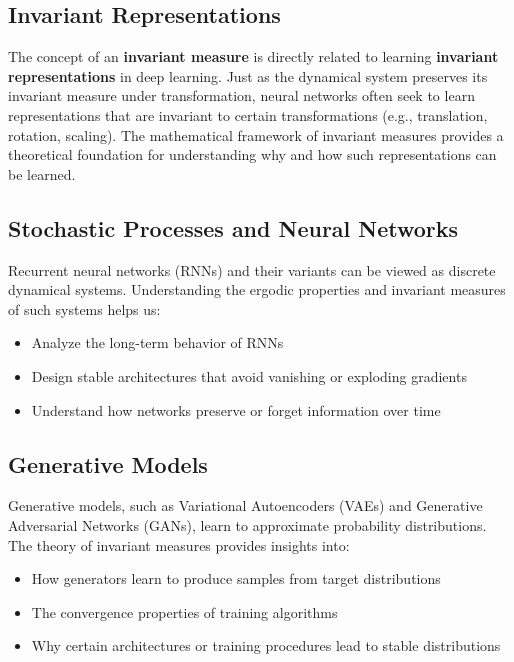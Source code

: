 \documentclass[12pt,a4paper]{article}
\begin{document}
\subsection{Invariant Representations}

The concept of an \textbf{invariant measure} is directly related to learning \textbf{invariant representations} in deep learning. Just as the dynamical system preserves its invariant measure under transformation, neural networks often seek to learn representations that are invariant to certain transformations (e.g., translation, rotation, scaling). The mathematical framework of invariant measures provides a theoretical foundation for understanding why and how such representations can be learned.

\subsection{Stochastic Processes and Neural Networks}

Recurrent neural networks (RNNs) and their variants can be viewed as discrete dynamical systems. Understanding the ergodic properties and invariant measures of such systems helps us:

\begin{itemize}
    \item Analyze the long-term behavior of RNNs
    \item Design stable architectures that avoid vanishing or exploding gradients
    \item Understand how networks preserve or forget information over time
\end{itemize}

\subsection{Generative Models}

Generative models, such as Variational Autoencoders (VAEs) and Generative Adversarial Networks (GANs), learn to approximate probability distributions. The theory of invariant measures provides insights into:

\begin{itemize}
    \item How generators learn to produce samples from target distributions
    \item The convergence properties of training algorithms
    \item Why certain architectures or training procedures lead to stable distributions
\end{itemize}
\end{document}
